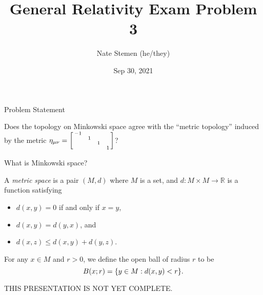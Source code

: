\documentclass[11pt,aspectratio=1610,xcolor=dvipsnames]{beamer}
\title{General Relativity Exam Problem 3}
\date{Sep 30, 2021}
\author{Nate Stemen (he/they)}
\institute{AMATH 875}
\newcommand{\GL}[2]{\mathsf{GL}(#1\,; #2)}
\newcommand{\R}{\mathbb{R}}
\newcommand{\1}{\mathbbm{1}}
\newcommand{\problemstatement}{Does the topology on Minkowski space agree with the ``metric topology'' induced by the metric $\eta_{\mu\nu} = \smqty[-1 & & &  \\ & \phantom{+}1 & & \\ & & \phantom{+}1 & \\ & & & \phantom{+}1]$?}
\begin{document}
\maketitle

\begin{frame}{Problem Statement}
	\large
	\begin{prob}
		\problemstatement
	\end{prob}
\end{frame}

\begin{frame}{What is Minkowski space?}
	\begin{definition}
		A \emph{metric space} is a pair $(M, d)$ where $M$ is a set, and $d: M \times M \to \R$ is a function satisfying
		\begin{itemize}
			\item $d(x, y) = 0$ if and only if $x = y$,
			\item $d(x, y) = d(y, x)$, and
			\item $d(x, z) \leq d(x, y) + d(y, z)$.
		\end{itemize}
	\end{definition}
	\pause
	\begin{definition}
		For any $x\in M$ and $r > 0$, we define the open ball of radius $r$ to be
		\begin{equation*}
			B(x; r) = \qty{y\in M : d(x, y) < r}.
		\end{equation*}
	\end{definition}
\end{frame}

\begin{frame}
	\huge THIS PRESENTATION IS NOT YET COMPLETE.
\end{frame}
\end{document}
